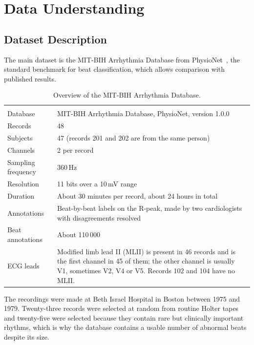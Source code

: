\section{Data Understanding}

\subsection{Dataset Description}

The main dataset is the MIT-BIH Arrhythmia Database from PhysioNet~\cite{moody2001mitbih}, the standard benchmark for beat classification, which allows comparison with published results.

\begin{table}[H]
  \centering
  \caption{Overview of the MIT-BIH Arrhythmia Database.}
  \label{tab:dataset}
  \begin{tabularx}{\linewidth}{l Y}
     &  \\
    Database           & MIT-BIH Arrhythmia Database, PhysioNet, version 1.0.0 \\
    Records            & 48 \\
    Subjects           & 47 (records 201 and 202 are from the same person) \\
    Channels           & 2 per record \\
    Sampling frequency & 360\,Hz \\
    Resolution         & 11 bits over a 10\,mV range \\
    Duration           & About 30 minutes per record, about 24 hours in total \\
    Annotations        & Beat-by-beat labels on the R-peak, made by two cardiologists with disagreements resolved \\
    Beat annotations   & About 110\,000 \\
    ECG leads          & Modified limb lead II (MLII) is present in 46 records and is the first channel in 45 of them; the other channel is usually V1, sometimes V2, V4 or V5. Records 102 and 104 have no MLII. \\
    \bottomrule
  \end{tabularx}

\end{table}

The recordings were made at Beth Israel Hospital in Boston between 1975 and 1979. Twenty-three records were selected at random from routine Holter tapes and twenty-five were selected because they contain rare but clinically important rhythms, which is why the database contains a usable number of abnormal beats despite its size.

